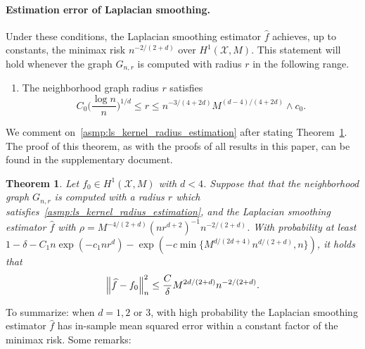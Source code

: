 \documentclass[twoside]{article}
\newcommand{\1}{\mathbf{1}}
\newcommand{\Xset}{\mathcal{X}}
\newcommand{\wh}[1]{\widehat{#1}}
\newtheorem{theorem}{Theorem}
\theoremstyle{definition}
\theoremstyle{remark}
\begin{document}
\paragraph{Estimation error of Laplacian smoothing.} 
Under these conditions, the Laplacian smoothing estimator $\wh{f}$ achieves, up to constants, the minimax risk $n^{-2/(2 + d)}$ over $H^1(\Xset,M)$. This statement will hold whenever the graph $G_{n,r}$ is computed with radius $r$ in the following range.
\begin{enumerate}[label=(R\arabic*)]
	\setcounter{enumi}{0}
	\item 
	\label{asmp:ls_kernel_radius_estimation}
	The neighborhood graph radius $r$ satisfies
	\begin{equation*}
	C_0\biggl(\frac{\log n}{n}\biggr)^{1/d} \leq r \leq n^{-3/(4 + 2d)} M^{(d - 4)/(4 + 2d)} \wedge c_0.
	\end{equation*}
\end{enumerate}
We comment on~\ref{asmp:ls_kernel_radius_estimation} after stating Theorem~\ref{thm:laplacian_smoothing_estimation1}. The proof of this theorem, as with the proofs of all results in this paper, can be found in the supplementary document.
\begin{theorem}
	\label{thm:laplacian_smoothing_estimation1}
	Let $f_0 \in H^1(\Xset,M)$ with $d < 4$. Suppose that that the neighborhood graph $G_{n,r}$ is computed with a radius $r$ which satisfies~\ref{asmp:ls_kernel_radius_estimation},  and the Laplacian smoothing estimator $\wh{f}$ with $\rho = M^{-4/(2 + d)} (nr^{d + 2})^{-1} n^{-2/(2 + d)}$. With probability at least $1 - \delta -  C_1n\exp(-c_1nr^d) - \exp(-c \min\{M^{d/(2d + 4)} n^{d/(2+d)},n\})$, it holds that
	\begin{equation}
	\label{eqn:laplacian_smoothing_estimation1}
	\Bigl\|\wh{f} - f_0\Bigr\|_n^2 \leq \frac{C}{\delta} M^{2d/(2 + d)} n^{-2/(2 + d)}.
	\end{equation}
\end{theorem}
To summarize: when $d = 1,2$ or $3$, with high probability the Laplacian smoothing estimator $\wh{f}$ has in-sample mean squared error within a constant factor of the minimax risk. Some remarks:
\end{document}
